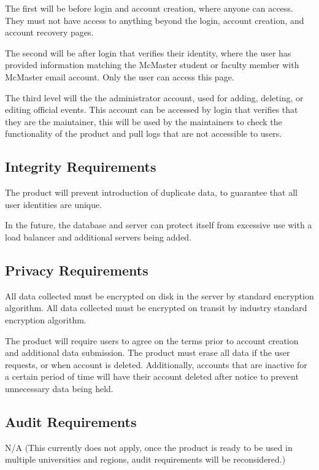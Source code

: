 \documentclass{article}
\begin{document}
The first will be before login and account creation, where anyone can access. They must not have access to anything beyond the login, account creation, and account recovery pages.

The second will be after login that verifies their identity, where the user has provided information matching the McMaster student or faculty member with McMaster email account. Only the user can access this page.

The third level will the the administrator account, used for adding, deleting, or editing official events. This account can be accessed by login that verifies that they are the maintainer, this will be used by the maintainers to check the functionality of the product  and pull logs that are not accessible to users.

\subsection{Integrity Requirements}

The product will prevent introduction of duplicate data, to guarantee that all user identities are unique.

In the future, the database and server can protect itself from excessive use with a load balancer and additional servers being added.

\subsection{Privacy Requirements}

All data collected must be encrypted on disk in the server by standard encryption algorithm.
All data collected must be encrypted on transit by industry standard encryption algorithm.

The product will require users to agree on the terms prior to account creation and additional data submission.
The product must erase all data if the user requests, or when account is deleted.
Additionally, accounts that are inactive for a certain period of time will have their account deleted after notice to prevent unnecessary data being held.

\subsection{Audit Requirements}

N/A (This currently does not apply, once the product is ready to be used in multiple universities and regions, audit requirements will be reconsidered.)
\end{document}
